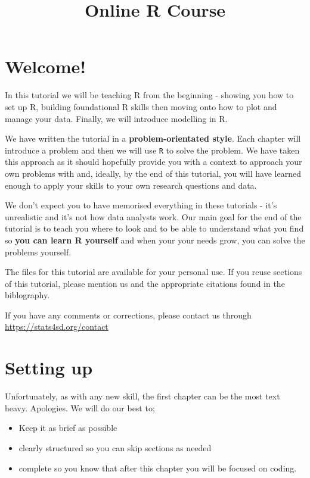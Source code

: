 \documentclass[]{book}
\title{Online R Course}
\author{}
\date{}
\providecommand{\tightlist}{%
  \setlength{\itemsep}{0pt}\setlength{\parskip}{0pt}}
\begin{document}
\maketitle

{
\setcounter{tocdepth}{1}
\tableofcontents
}
\hypertarget{welcome}{%
\chapter{Welcome!}\label{welcome}}

In this tutorial we will be teaching R from the beginning - showing you how to set up R, building foundational R skills then moving onto how to plot and manage your data. Finally, we will introduce modelling in R.

We have written the tutorial in a \textbf{problem-orientated style}. Each chapter will introduce a problem and then we will use \texttt{R} to solve the problem. We have taken this approach as it should hopefully provide you with a context to approach your own problems with and, ideally, by the end of this tutorial, you will have learned enough to apply your skills to your own research questions and data.

We don't expect you to have memorised everything in these tutorials - it's unrealistic and it's not how data analysts work. Our main goal for the end of the tutorial is to teach you where to look and to be able to understand what you find so \textbf{you can learn R yourself} and when your your needs grow, you can solve the problems yourself.

The files for this tutorial are available for your personal use. If you reuse sections of this tutorial, please mention us and the appropriate citations found in the biblography.

If you have any comments or corrections, please contact us through \url{https://stats4sd.org/contact}

\hypertarget{setting-up}{%
\chapter{Setting up}\label{setting-up}}

Unfortunately, as with any new skill, the first chapter can be the most text heavy. Apologies. We will do our best to;

\begin{itemize}
\tightlist
\item
  Keep it as brief as possible
\item
  clearly structured so you can skip sections as needed
\item
  complete so you know that after this chapter you will be focused on coding.
\end{itemize}
\end{document}
